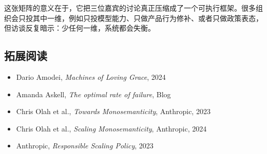 这张矩阵的意义在于，它把三位嘉宾的讨论真正压缩成了一个可执行框架。很多组织会只投其中一维，例如只投模型能力、只做产品行为修补、或者只做政策表态，但访谈反复暗示：少任何一维，系统都会失衡。

\subsection{拓展阅读}

\begin{itemize}
    \item Dario Amodei, \textit{Machines of Loving Grace}, 2024
    \item Amanda Askell, \textit{The optimal rate of failure}, Blog
    \item Chris Olah et al., \textit{Towards Monosemanticity}, Anthropic, 2023
    \item Chris Olah et al., \textit{Scaling Monosemanticity}, Anthropic, 2024
    \item Anthropic, \textit{Responsible Scaling Policy}, 2023
\end{itemize}


